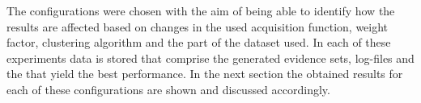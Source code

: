 The configurations were chosen with the aim of being able to identify how the results are affected based on changes in the used acquisition function, weight factor, clustering algorithm and the part of the dataset used.
In each of these experiments data is stored that comprise the generated evidence sets, log-files and the  that yield the best performance.
In the next section the obtained results for each of these configurations are shown and discussed accordingly.


%
%
%

